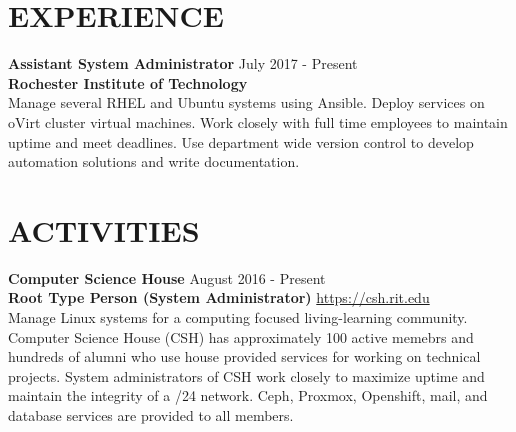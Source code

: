 \documentclass[line, margin, 11pt]{res}
\begin{document}
\begin{resume}
\section{EXPERIENCE}
{\bf \large{Assistant System Administrator}} \hfill July 2017 - Present \\
{\bf Rochester Institute of Technology} \\
Manage several RHEL and Ubuntu systems using Ansible.  Deploy services on oVirt cluster virtual machines.  Work closely with full
time employees to maintain uptime and meet deadlines.  Use department wide version control to develop automation solutions and write documentation.

\section{ACTIVITIES}
{\bf \large{Computer Science House}} \hfill August 2016 - Present \\
{\bf Root Type Person (System Administrator)} \hfill \url{https://csh.rit.edu} \\
Manage Linux systems for a computing focused living-learning community.
Computer Science House (CSH) has approximately 100 active memebrs and hundreds of alumni
who use house provided services for working on technical projects.  System administrators of CSH
work closely to maximize uptime and maintain the integrity of a /24 network.  Ceph, Proxmox,
Openshift, mail, and database services are provided to all members.

\end{resume}
\end{document}
